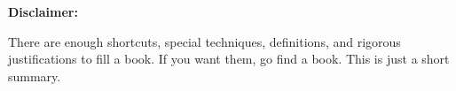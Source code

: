 \textbf{Disclaimer:}
\vspace{-.8\parskip}

There are enough shortcuts, special techniques, definitions, and rigorous justifications to fill a book. If you want them, go find a book.  This is just a short summary.


